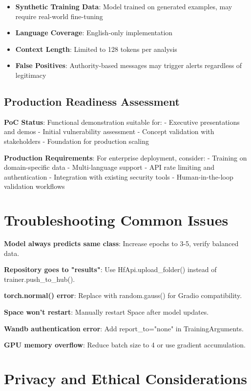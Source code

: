 \documentclass[11pt,a4paper]{article}
\begin{document}
\begin{itemize}
\item \textbf{Synthetic Training Data}: Model trained on generated examples, may require real-world fine-tuning
\item \textbf{Language Coverage}: English-only implementation
\item \textbf{Context Length}: Limited to 128 tokens per analysis
\item \textbf{False Positives}: Authority-based messages may trigger alerts regardless of legitimacy
\end{itemize}

\subsection{Production Readiness Assessment}

\textbf{PoC Status}: Functional demonstration suitable for:
- Executive presentations and demos
- Initial vulnerability assessment
- Concept validation with stakeholders
- Foundation for production scaling

\textbf{Production Requirements}: For enterprise deployment, consider:
- Training on domain-specific data
- Multi-language support
- API rate limiting and authentication
- Integration with existing security tools
- Human-in-the-loop validation workflows

\section{Troubleshooting Common Issues}

\textbf{Model always predicts same class}: Increase epochs to 3-5, verify balanced data.

\textbf{Repository goes to "results"}: Use HfApi.upload\_folder() instead of trainer.push\_to\_hub().

\textbf{torch.normal() error}: Replace with random.gauss() for Gradio compatibility.

\textbf{Space won't restart}: Manually restart Space after model updates.

\textbf{Wandb authentication error}: Add report\_to="none" in TrainingArguments.

\textbf{GPU memory overflow}: Reduce batch size to 4 or use gradient accumulation.

\section{Privacy and Ethical Considerations}
\end{document}
